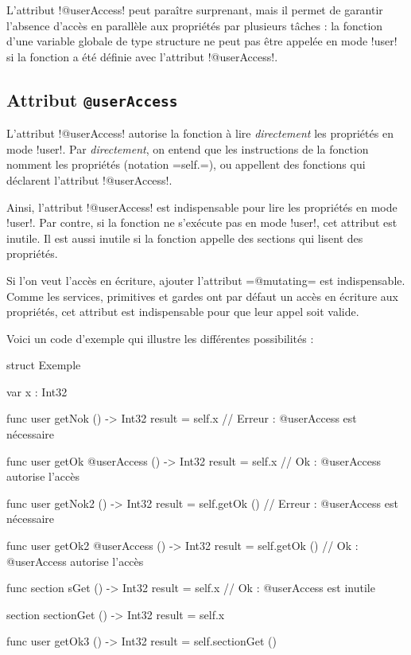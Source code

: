 L'attribut \plm!@userAccess! peut paraître surprenant, mais il permet de garantir l'absence d'accès en parallèle aux propriétés par plusieurs tâches : la fonction d'une variable globale de type structure ne peut pas être appelée en mode \plm!user! si la fonction a été définie avec l'attribut  \plm!@userAccess!.

\subsection{Attribut \texttt{@userAccess}}

L'attribut \plm!@userAccess! autorise la fonction à lire \emph{directement} les propriétés en mode \plm!user!. Par \emph{directement}, on entend que les instructions de la fonction nomment les propriétés (notation \plm=self.=), ou appellent des fonctions qui déclarent l'attribut \plm!@userAccess!.

Ainsi, l'attribut \plm!@userAccess! est indispensable pour lire les propriétés en mode \plm!user!. Par contre, si la fonction ne s'exécute pas en mode \plm!user!, cet attribut est inutile. Il est aussi inutile si la fonction appelle des sections qui lisent des propriétés.

Si l'on veut l'accès en écriture, ajouter l'attribut \plm=@mutating= est indispensable. Comme les services, primitives et gardes ont par défaut un accès en écriture aux propriétés, cet attribut est indispensable pour que leur appel soit valide. 

Voici un code d'exemple qui illustre les différentes possibilités :
\begin{PLM}
struct Exemple {
  var x : Int32
  
  func user getNok () -> Int32 {
    result = self.x // Erreur : @userAccess est nécessaire
  }
  
  func user getOk @userAccess () -> Int32 {
    result = self.x // Ok : @userAccess autorise l'accès
  }
  
  func user getNok2  () -> Int32 {
    result = self.getOk () // Erreur : @userAccess est nécessaire
  }
  
  func user getOk2 @userAccess () -> Int32 {
    result = self.getOk () // Ok : @userAccess autorise l'accès
  }
  
  func section sGet () -> Int32 {
    result = self.x // Ok : @userAccess est inutile
  }
  
  section sectionGet () -> Int32 {
    result = self.x
  }

  func user getOk3 () -> Int32 {
    result = self.sectionGet ()
  }
}
\end{PLM}

